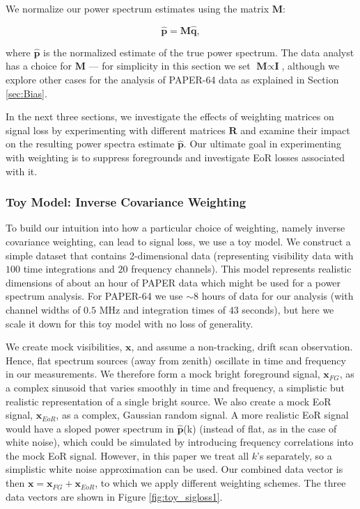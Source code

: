 \documentclass[preprint2,numberedappendix,tighten]{aastex6}  %
\begin{document}
We normalize our power spectrum estimates using the matrix $\textbf{M}$:

\begin{equation}
\label{eq:phat}
\hat{\textbf{p}} = \textbf{M}\hat{\textbf{q}},
\end{equation}

\noindent where $\hat{\textbf{p}}$ is the normalized estimate of the true power spectrum. The data analyst has a choice for $\textbf{M}$ --- for simplicity in this section we set $\textbf{M} \propto \textbf{I}$, although we explore other cases for the analysis of PAPER-64 data as explained in Section \ref{sec:Bias}.

In the next three sections, we investigate the effects of weighting matrices on signal loss by experimenting with different matrices $\textbf{R}$ and examine their impact on the resulting power spectra estimate $\hat{\textbf{p}}$. Our ultimate goal in experimenting with weighting is to suppress foregrounds and investigate EoR losses associated with it.

\subsubsection{Toy Model: Inverse Covariance Weighting}
\label{sec:toymodel}

To build our intuition into how a particular choice of weighting, namely inverse covariance weighting, can lead to signal loss, we use a toy model. We construct a simple dataset that contains 2-dimensional data (representing visibility data with $100$ time integrations and $20$ frequency channels). This model represents realistic dimensions of about an hour of PAPER data which might be used for a power spectrum analysis. For PAPER-64 we use $\sim$$8$ hours of data for our analysis (with channel widths of $0.5$ MHz and integration times of $43$ seconds), but here we scale it down for this toy model with no loss of generality. 

We create mock visibilities, $\textbf{x}$, and assume a non-tracking, drift scan observation. Hence, flat spectrum sources (away from zenith) oscillate in time and frequency in our measurements. We therefore form a mock bright foreground signal, $\textbf{x}_{FG}$, as a complex sinusoid that varies smoothly in time and frequency, a simplistic but realistic representation of a single bright source. We also create a mock EoR signal, $\textbf{x}_{EoR}$, as a complex, Gaussian random signal. A more realistic EoR signal would have a sloped power spectrum in $\hat{\textbf{p}}$(k) (instead of flat, as in the case of white noise), which could be simulated by introducing frequency correlations into the mock EoR signal. However, in this paper we treat all $k$'s separately, so a simplistic white noise approximation can be used. Our combined data vector is then $\textbf{x} = \textbf{x}_{FG} + \textbf{x}_{EoR}$, to which we apply different weighting schemes. The three data vectors are shown in Figure \ref{fig:toy_sigloss1}. 
\end{document}
